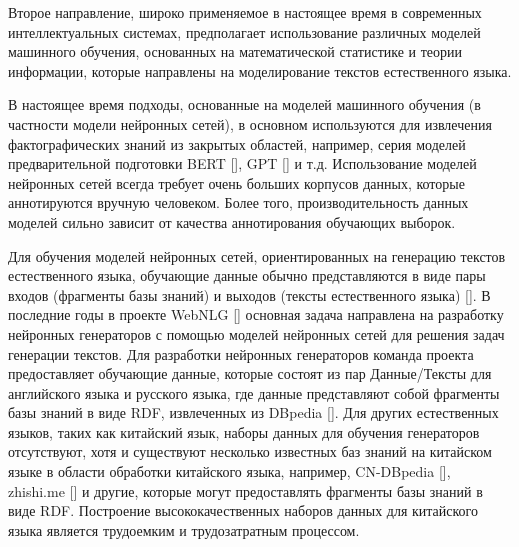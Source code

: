 Второе направление, широко применяемое в настоящее время в современных интеллектуальных системах, предполагает использование различных моделей машинного обучения, основанных на математической статистике и теории информации, которые направлены на моделирование текстов естественного языка.

В настоящее время подходы, основанные на моделей машинного обучения (в частности модели нейронных сетей), в основном используются для извлечения фактографических знаний из закрытых областей, например, серия моделей предварительной подготовки BERT [], GPT [] и т.д. Использование моделей нейронных сетей всегда требует очень больших корпусов данных, которые аннотируются вручную человеком. Более того, производительность данных моделей сильно зависит от качества аннотирования обучающих выборок. 

Для обучения моделей нейронных сетей, ориентированных на генерацию текстов естественного языка, обучающие данные обычно представляются в виде пары входов (фрагменты базы знаний) и выходов (тексты естественного языка) []. В последние годы в проекте WebNLG [] основная задача направлена на разработку нейронных генераторов с помощью моделей нейронных сетей для решения задач генерации текстов. Для разработки нейронных генераторов команда проекта предоставляет обучающие данные, которые состоят из пар Данные/Тексты для английского языка и русского языка, где данные представляют собой фрагменты базы знаний в виде RDF, извлеченных из DBpedia []. Для других естественных языков, таких как китайский язык, наборы данных для обучения генераторов отсутствуют, хотя и существуют несколько известных баз знаний на китайском языке в области обработки китайского языка, например, CN-DBpedia [], zhishi.me [] и другие, которые могут предоставлять фрагменты базы знаний в виде RDF. Построение высококачественных наборов данных для китайского языка является трудоемким и трудозатратным процессом. 

